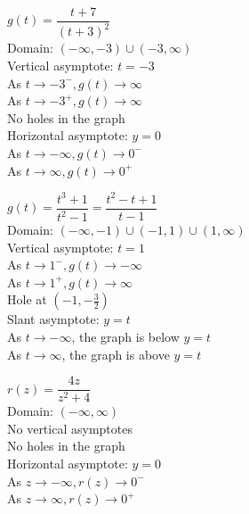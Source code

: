 \begin{exenum}
\item $g(t) = \dfrac{t + 7}{(t + 3)^{2}}$ \\
Domain: $(-\infty, -3) \cup (-3, \infty)$\\
Vertical asymptote: $t = -3$\\
As $t \rightarrow -3^{-}, g(t) \rightarrow \infty$\\
As $t \rightarrow -3^{+}, g(t) \rightarrow \infty$\\
No holes in the graph\\
Horizontal asymptote: $y = 0$ \\
As $t \rightarrow -\infty, g(t) \rightarrow 0^{-}$\\
As $t \rightarrow \infty, g(t) \rightarrow 0^{+}$\\

\item $g(t) = \dfrac{t^{3} + 1}{t^{2} - 1} = \dfrac{t^{2} - t+ 1}{t-1}$\\
Domain: $(-\infty, -1) \cup (-1, 1) \cup (1, \infty)$\\
Vertical asymptote: $t = 1$\\
As $t \rightarrow 1^{-}, g(t) \rightarrow -\infty$\\
As $t \rightarrow 1^{+}, g(t) \rightarrow \infty$\\
Hole at $(-1, -\frac{3}{2})$\\
Slant asymptote: $y=t$  \\
As $t \rightarrow -\infty$, the graph is below $y=t$\\
As $t \rightarrow \infty$, the graph is above $y=t$\\

\item $r(z) = \dfrac{4z}{z^{2} + 4}$\\
Domain: $(-\infty,  \infty)$\\
No vertical asymptotes \\
No holes in the graph\\
Horizontal asymptote: $y = 0$ \\
As $z \rightarrow -\infty, r(z) \rightarrow 0^{-}$\\
As $z \rightarrow \infty, r(z) \rightarrow 0^{+}$\\


\end{exenum}
